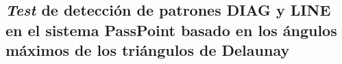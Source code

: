 \documentclass[12pt]{report}
\begin{document}
\subsection{\textit{Test} de detección de patrones DIAG y LINE en el sistema PassPoint basado en los ángulos máximos de los triángulos de Delaunay  }




\end{document}
